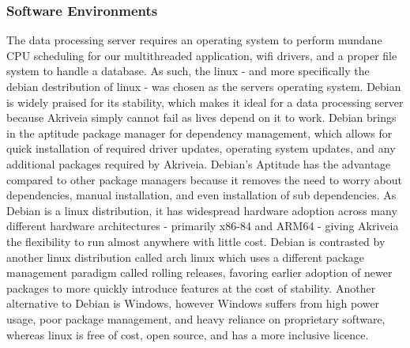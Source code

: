 \bigskip
\subsubsection{Software Environments}
The data processing server requires an operating system to perform mundane CPU scheduling for our multithreaded application, wifi drivers, and a proper file system to handle a database.
As such, the linux - and more specifically the debian destribution of linux - was chosen as the servers operating system.
\smallskip
Debian is widely praised for its stability, which makes it ideal for a data processing server because Akriveia simply cannot fail as lives depend on it to work.
Debian brings in the aptitude package manager for dependency management, which allows for quick installation of required driver updates, operating system updates, and any additional packages required by Akriveia.
Debian's Aptitude has the advantage compared to other package managers because it removes the need to worry about dependencies, manual installation, and even installation of sub dependencies.
As Debian is a linux distribution, it has widespread hardware adoption across many different hardware architectures - primarily x86-84 and ARM64 - giving Akriveia the flexibility to run almost anywhere with little cost.
\smallskip
Debian is contrasted by another linux distribution called arch linux which uses a different package management paradigm called rolling releases, favoring earlier adoption of newer packages to more quickly introduce features at the cost of stability.
Another alternative to Debian is Windows, however Windows suffers from high power usage, poor package management, and heavy reliance on proprietary software, whereas linux is free of cost, open source, and has a more inclusive licence.

\bigskip
